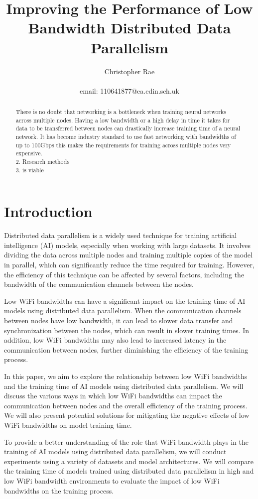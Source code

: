 \documentclass[10pt]{extarticle}
\title{Improving the Performance of Low Bandwidth Distributed Data Parallelism}
\author{Christopher Rae \\ \begin{small} email: 110641877@ea.edin.sch.uk \end{small}}
\date{}
\begin{document}
\maketitle

\begin{abstract}
There is no doubt that networking is a bottleneck when training neural networks across multiple nodes. Having a low bandwidth or a high delay in time it takes for data to be transferred between nodes can drastically increase training time of a neural network. It has become industry standard to use fast networking with bandwidths of up to 100Gbps this makes the requirements for training across multiple nodes very expensive. \\
2. Research methods\\
3. is viable
\end{abstract}


\section{Introduction}
Distributed data parallelism is a widely used technique for training artificial intelligence (AI) models, especially when working with large datasets. It involves dividing the data across multiple nodes and training multiple copies of the model in parallel, which can significantly reduce the time required for training. However, the efficiency of this technique can be affected by several factors, including the bandwidth of the communication channels between the nodes.

Low WiFi bandwidths can have a significant impact on the training time of AI models using distributed data parallelism. When the communication channels between nodes have low bandwidth, it can lead to slower data transfer and synchronization between the nodes, which can result in slower training times. In addition, low WiFi bandwidths may also lead to increased latency in the communication between nodes, further diminishing the efficiency of the training process.

In this paper, we aim to explore the relationship between low WiFi bandwidths and the training time of AI models using distributed data parallelism. We will discuss the various ways in which low WiFi bandwidths can impact the communication between nodes and the overall efficiency of the training process. We will also present potential solutions for mitigating the negative effects of low WiFi bandwidths on model training time.

To provide a better understanding of the role that WiFi bandwidth plays in the training of AI models using distributed data parallelism, we will conduct experiments using a variety of datasets and model architectures. We will compare the training time of models trained using distributed data parallelism in high and low WiFi bandwidth environments to evaluate the impact of low WiFi bandwidths on the training process.
\end{document}
